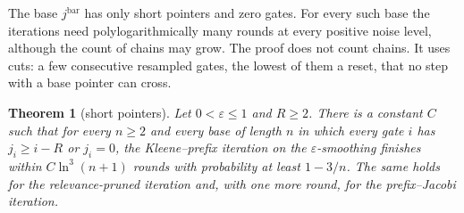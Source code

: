 \documentclass[11pt]{amsart}
\newtheorem{theorem}{Theorem}
\theoremstyle{definition}
\theoremstyle{remark}
\newcommand{\eps}{\varepsilon}
\begin{document}
The base $j^{\mathrm{bar}}$ has only short pointers and zero gates. For every such base the
iterations need polylogarithmically many rounds at every positive noise level, although the count
of chains may grow. The proof does
not count chains. It uses cuts: a few consecutive resampled gates, the lowest of them a reset,
that no step with a base pointer can cross.

\begin{theorem}[short pointers]\label{thm:short}
Let $0<\eps\le1$ and $R\ge2$. There is a constant $C$ such that for every $n\ge2$ and every base
of length $n$ in which every gate $i$ has $j_i\ge i-R$ or $j_i=0$, the Kleene--prefix iteration on
the $\eps$-smoothing finishes within $C\ln^3(n+1)$ rounds with probability at least $1-3/n$. The
same holds for the relevance-pruned iteration and, with one more round, for the prefix--Jacobi
iteration.
\end{theorem}
\end{document}
